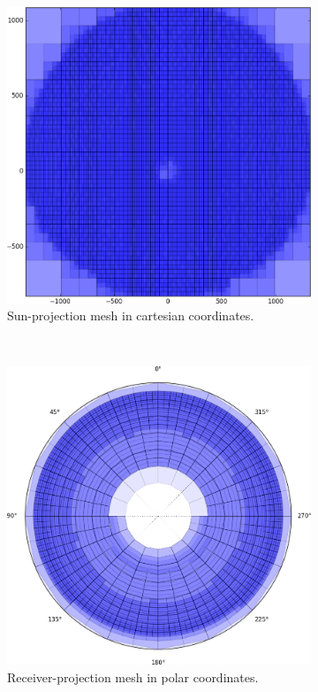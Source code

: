 \documentclass[11pt,letterpaper]{article}
\begin{document}
\begin{figure}[htb]
\begin{subfigure}{0.48\linewidth}
	\includegraphics[width=\linewidth]{full-mesh}
	\caption{Sun-projection mesh in cartesian coordinates.}
	\label{fig:full-mesh}
\end{subfigure}
~
\begin{subfigure}{0.48\linewidth}
	\includegraphics[width=\linewidth]{polar-mesh}
	\caption{Receiver-projection mesh in polar coordinates.}
	\label{fig:polar-mesh}
\end{subfigure}
\caption{}
\label{fig:meshes}
\end{figure}
\end{document}

